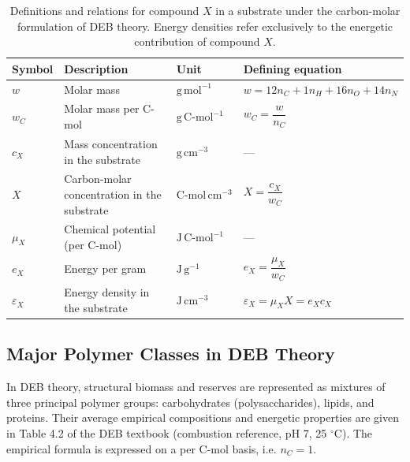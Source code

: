 \documentclass[11pt]{article}
\begin{document}
\begin{table}[h]
\centering
\small
\begin{tabularx}{\textwidth}{>{\raggedright\arraybackslash}p{1.8cm} >{\raggedright\arraybackslash}p{4.4cm} >{\raggedright\arraybackslash}p{2.7cm} >{\raggedright\arraybackslash}X}
\toprule
Symbol & Description & Unit & Defining equation \\
\midrule
$w$ & Molar mass & $\mathrm{g\,mol^{-1}}$ & $w = 12 n_C + 1 n_H + 16 n_O + 14 n_N$ \\
$w_C$ & Molar mass per C-mol & $\mathrm{g\,C\text{-}mol^{-1}}$ & $w_C = \dfrac{w}{n_C}$ \\
$c_X$ & Mass concentration in the substrate & $\mathrm{g\,cm^{-3}}$ & --- \\
$X$ & Carbon-molar concentration in the substrate & $\mathrm{C\text{-}mol\,cm^{-3}}$ & $X = \dfrac{c_X}{w_C}$ \\
$\mu_X$ & Chemical potential (per C-mol) & $\mathrm{J\,C\text{-}mol^{-1}}$ & --- \\
$e_X$ & Energy per gram & $\mathrm{J\,g^{-1}}$ & $e_X = \dfrac{\mu_X}{w_C}$ \\
$\varepsilon_X$ & Energy density in the substrate & $\mathrm{J\,cm^{-3}}$ & $\varepsilon_X = \mu_X X = e_X c_X$ \\
\bottomrule
\end{tabularx}
\normalsize
\caption{Definitions and relations for compound $X$ in a substrate under the carbon-molar formulation of DEB theory. Energy densities refer exclusively to the energetic contribution of compound $X$.}
\label{tab:single-compound}
\end{table}

\subsection*{Major Polymer Classes in DEB Theory}

In DEB theory, structural biomass and reserves are represented as mixtures of three principal polymer groups: carbohydrates (polysaccharides), lipids, and proteins. Their average empirical compositions and energetic properties are given in Table 4.2 of the DEB textbook (combustion reference, pH 7, 25 $^\circ$C). The empirical formula is expressed on a per C-mol basis, i.e. $n_C=1$.
\end{document}
